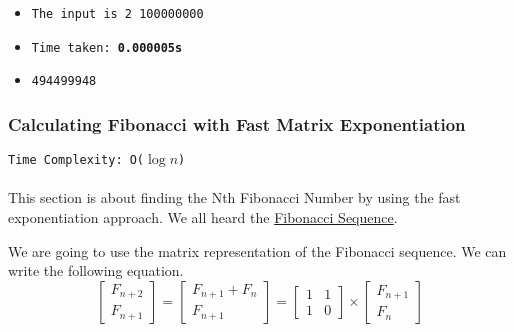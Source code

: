 \documentclass[12pt]{article}
\begin{document}
\begin{itemize}
  \item \texttt{The input is 2 100000000} 
  \item \texttt{Time taken: \textbf{0.000005s}} 
  \item \texttt{494499948}
\end{itemize}

\subsubsection{Calculating Fibonacci with Fast Matrix Exponentiation}
\texttt{Time Complexity: O($\log{n}$) } \\ \\
This section is about finding the Nth Fibonacci Number by using the fast exponentiation approach. We all heard the \href{https://en.wikipedia.org/wiki/Fibonacci_number}{Fibonacci Sequence}. 

We are going to use the matrix representation of the Fibonacci sequence. We can write the following equation. \cite{fibonaccimatrix}
\[
\begin{bmatrix}
    F_{n+2} \\
    F_{n+1}
\end{bmatrix}
=
\begin{bmatrix}
    F_{n+1} + F_{n}\\
    F_{n+1}
\end{bmatrix}
=
\begin{bmatrix}
    1 & 1  \\
    1 & 0
\end{bmatrix}
\times
\begin{bmatrix}
    F_{n+1} \\
    F_{n}
\end{bmatrix}
\]
\end{document}
